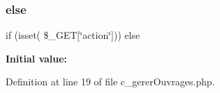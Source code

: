\subsubsection{\texorpdfstring{else}{else}}
{\footnotesize\ttfamily if (isset( \$\+\_\+\+G\+ET\mbox{[}\char`\"{}action\char`\"{}\mbox{]})) else}

{\bfseries Initial value\+:}


Definition at line 19 of file c\+\_\+gerer\+Ouvrages.\+php.

